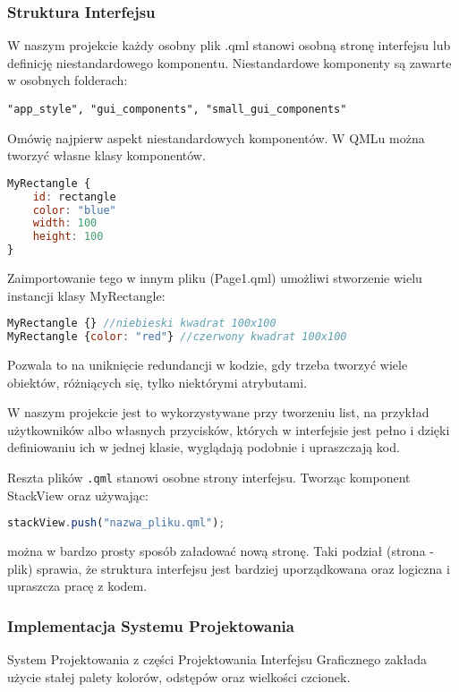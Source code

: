 \subsubsection{Struktura Interfejsu}
\label{sec:Struktura Interfejsu}
W naszym projekcie każdy osobny plik .qml stanowi osobną stronę interfejsu lub
definicję niestandardowego komponentu. Niestandardowe komponenty są zawarte
w osobnych folderach: \begin{lstlisting}
"app_style", "gui_components", "small_gui_components"
\end{lstlisting}

Omówię najpierw aspekt niestandardowych komponentów. W QMLu można tworzyć własne klasy komponentów.

\begin{lstlisting}[language=QML, caption={Przykładowa klasa w MyRectangle.qml}]
MyRectangle {
    id: rectangle
    color: "blue"
    width: 100
    height: 100
}
\end{lstlisting}
Zaimportowanie tego w innym pliku (Page1.qml) umożliwi stworzenie
wielu instancji klasy MyRectangle:

\begin{lstlisting}[language=QML, caption={Przykładowe użycie klasy MyRectangle}]
MyRectangle {} //niebieski kwadrat 100x100
MyRectangle {color: "red"} //czerwony kwadrat 100x100
\end{lstlisting}
Pozwala to na uniknięcie redundancji w kodzie, gdy trzeba tworzyć
wiele obiektów, różniących się, tylko niektórymi atrybutami.

W naszym projekcie jest to wykorzystywane przy tworzeniu list, na przykład
użytkowników albo własnych przycisków, których w interfejsie jest pełno i dzięki definiowaniu ich w jednej klasie, wyglądają podobnie i upraszczają kod.

Reszta plików \texttt{.qml} stanowi osobne strony interfejsu. 
Tworząc komponent StackView oraz używając:
\begin{lstlisting}[language=QML, caption={Ładowanie nowej strony}]
stackView.push("nazwa_pliku.qml");
\end{lstlisting}
można w bardzo prosty sposób załadować nową stronę.
Taki podział (strona - plik) sprawia, że struktura interfejsu jest bardziej
uporządkowana oraz logiczna i upraszcza pracę z kodem.

\subsubsection{Implementacja Systemu Projektowania}
\label{sec:ImplementacjaSystemuProjektowania}
System Projektowania z części Projektowania Interfejsu Graficznego zakłada użycie stałej palety kolorów, odstępów oraz wielkości czcionek.

